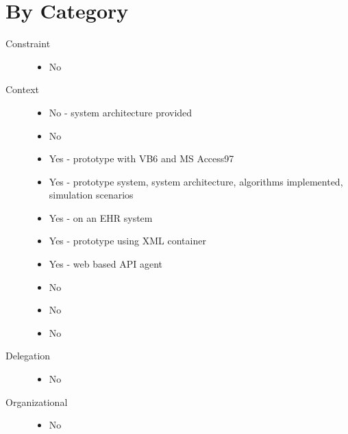 \documentclass[letterpaper,10pt,english]{sphinxmanual}
\begin{document}
\section{By Category}
\label{research_questions/RQ_5:by-category}\begin{description}
\item[{Constraint}] \leavevmode\begin{itemize}
\item {} 
No

\end{itemize}

\item[{Context}] \leavevmode\begin{itemize}
\item {} 
No - system architecture provided

\item {} 
No

\item {} 
Yes - prototype with VB6 and MS Access97

\item {} 
Yes - prototype system, system architecture, algorithms implemented, simulation scenarios

\item {} 
Yes - on an EHR system

\item {} 
Yes - prototype using XML container

\item {} 
Yes - web based API agent

\item {} 
No

\item {} 
No

\item {} 
No

\end{itemize}

\item[{Delegation}] \leavevmode\begin{itemize}
\item {} 
No

\end{itemize}

\item[{Organizational}] \leavevmode\begin{itemize}
\item {} 
No

\end{itemize}


\end{description}
\end{document}
